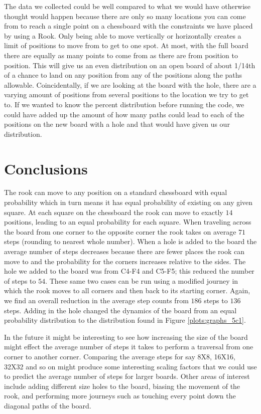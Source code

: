 \documentclass{amsart}
\numberwithin{equation}{section}
\begin{document}
The data we collected could be well compared to what we would have otherwise thought would happen because there are only so many locations you can come from to reach a single point on a chessboard with the constraints we have placed by using a Rook. Only being able to move vertically or horizontally creates a limit of positions to move from to get to one spot. At most, with the full board there are equally as many points to come from as there are from position to position. This will give us an even distribution on an open board of about 1/14th of a chance to land on any position from any of the positions along the paths allowable. Coincidentally, if we are looking at the board with the hole, there are a varying amount of positions from several positions to the location we try to get to. If we wanted to know the percent distribution before running the code, we could have added up the amount of how many paths could lead to each of the positions on the new board with a hole and that would have given us our distribution.



\section{Conclusions}
The rook can move to any position on a standard chessboard with equal probability which in turn means it has equal probability of existing on any given square. At each square on the chessboard the rook can move to exactly $14$ positions, leading to an equal probability for each square. When traveling across the board from one corner to the opposite corner the rook takes on average $71$ steps (rounding to nearest whole number). When a hole is added to the board the average number of steps decreases because there are fewer places the rook can move to and the probability for the corners increases relative to the sides. The hole we added to the board was from C4-F4 and C5-F5; this reduced the number of steps to $54$. These same two cases can be run using a modified journey in which the rook moves to all corners and then back to its starting corner. Again, we find an overall reduction in the average step counts from $186$ steps to $136$ steps. Adding in the hole changed the dynamics of the board from an equal probability distribution to the distribution found in Figure \ref{plots:graphs_5c1}. \par
In the future it might be interesting to see how increasing the size of the board might effect the average number of steps it takes to perform a traversal from one corner to another corner. Comparing the average steps for say 8X8, 16X16, 32X32 and so on might produce some interesting scaling factors that we could use to predict the average number of steps for larger boards. Other areas of interest include adding different size holes to the board, biasing the movement of the rook, and performing more journeys such as touching every point down the diagonal paths of the board.
\end{document}
